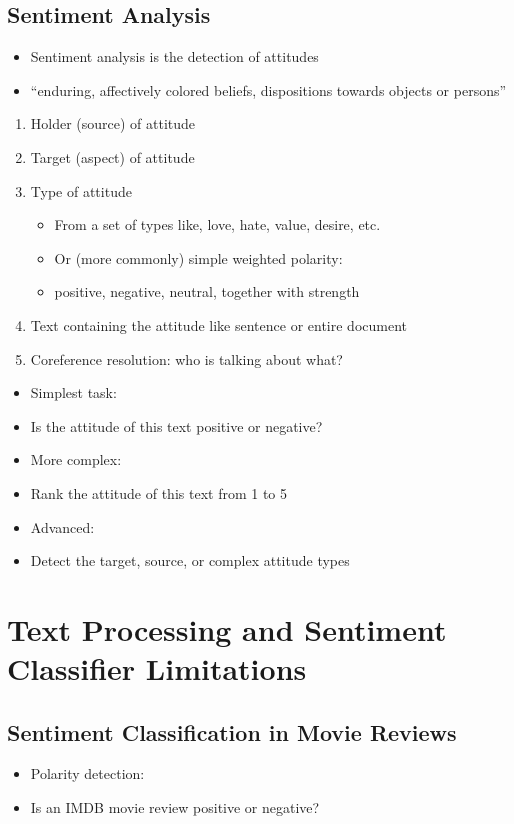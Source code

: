 \documentclass[11pt]{article}
\theoremstyle{definition}
\begin{document}
\subsection{Sentiment Analysis}
\begin{itemize}
  \item Sentiment analysis is the detection of attitudes
  \item “enduring, affectively colored beliefs, dispositions towards objects or persons”
\end{itemize}
\begin{enumerate}
  \item Holder (source) of attitude
  \item Target (aspect) of attitude
  \item Type of attitude
  \begin{itemize}
    \item From a set of types like, love, hate, value, desire, etc.
    \item Or (more commonly) simple weighted polarity: 
    \item positive, negative, neutral, together with strength
  \end{itemize}
  \item Text containing the attitude like sentence or entire document
  \item Coreference resolution: who is talking about what?
\end{enumerate}
\begin{itemize}
  \item Simplest task:
  \item Is the attitude of this text positive or negative?
  \item More complex:
  \item Rank the attitude of this text from 1 to 5
  \item Advanced:
  \item Detect the target, source, or complex attitude types
\end{itemize}

\section{Text Processing and
Sentiment Classifier
Limitations}
\subsection{Sentiment Classification in Movie Reviews}
\begin{itemize}
  \item Polarity detection:
  \item Is an IMDB movie review positive or negative?
\end{itemize}
\end{document}
